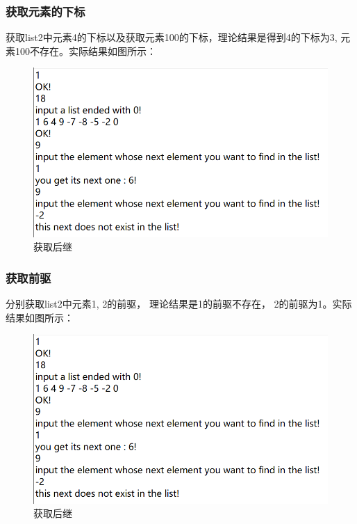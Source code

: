 \documentclass[supercite]{Experimental_Report}
\theoremstyle{definition}
\begin{document}
\subsubsection{获取元素的下标}
获取list2中元素4的下标以及获取元素100的下标，理论结果是得到4的下标为3, 元素100不存在。实际结果如图所示：
\begin{figure}[htbp]
	\centering
	\includegraphics[scale = 0.7]{images/8.png}
	\caption{获取后继}
\end{figure}

\subsubsection{获取前驱}
分别获取list2中元素1, 2的前驱， 理论结果是1的前驱不存在， 2的前驱为1。实际结果如图所示：
\begin{figure}[htbp]
	\centering
	\includegraphics[scale = 0.7]{images/8.png}
	\caption{获取后继}
\end{figure}
\end{document}
